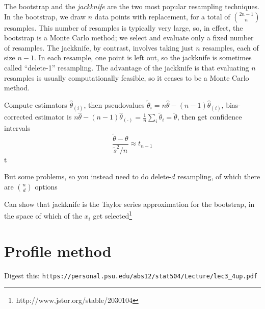 The bootstrap and the \emph{jackknife} are the two most popular resampling techniques. In the bootstrap, we draw $n$ data points with replacement, for a total of $\binom{2n-1}{n}$ resamples. This number of resamples is typically very large, so, in effect, the bootstrap is a Monte Carlo method; we select and evaluate only a fixed number of resamples. The jackknife, by contrast, involves taking just $n$ resamples, each of size $n-1$. In each resample, one point is left out, so the jackknife is sometimes called ``delete-1'' resampling. The advantage of the jackknife is that evaluating $n$ resamples is usually computationally feasible, so it ceases to be a Monte Carlo method.

Compute estimators $\hat{\theta}_{(i)}$, then pseudovalues $\tilde{\theta}_i = n \hat{\theta} -(n-1) \hat{\theta}_{(i)}$, bias-corrected estimator is $n\hat{\theta} - (n-1)\hat{\theta}_{(\cdot)} = \frac{1}{n}\sum_i \tilde{\theta}_i = \tilde{\theta}$, then get confidence intervals
$$
\frac{\tilde{\theta} - \theta}{\tilde{s}^2 /n} \approx t_{n-1}
$$t

But some problems, so you instead need to do delete-$d$ resampling, of which there are $\binom{n}{d}$ options

Can show that jackknife is the Taylor series approximation for the bootstrap, in the space of which of the $x_i$ get selected\footnote{http://www.jstor.org/stable/2030104}

\section{Profile method}

Digest this: \texttt{https://personal.psu.edu/abs12/stat504/Lecture/lec3\_4up.pdf}
